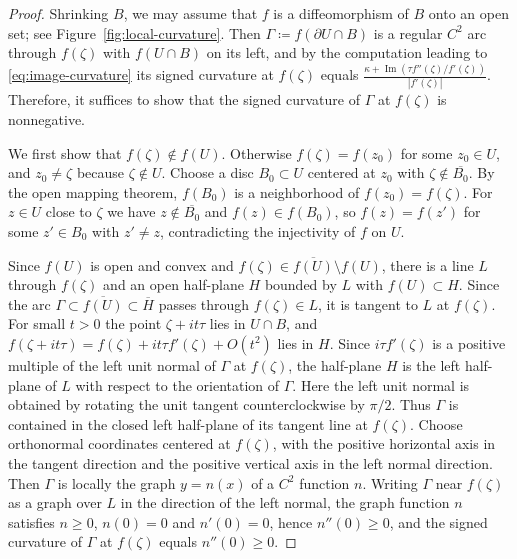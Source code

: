 \documentclass[a4paper, reqno, 11pt]{amsart}
\theoremstyle{definition}
\begin{document}
\begin{proof}
Shrinking $B$, we may assume that $f$ is a diffeomorphism of $B$ onto an open set; see Figure~\ref{fig:local-curvature}.
Then $\Gamma \coloneqq  f(\partial U \cap B)$ is a regular $C^2$ arc through $f(\zeta)$ with $f(U \cap B)$ on its left, and by the computation leading to \eqref{eq:image-curvature} its signed curvature at $f(\zeta)$ equals $\frac{ \kappa + \operatorname{Im}( \tau f''(\zeta)/f'(\zeta) ) }{ |f'(\zeta)| }$.
Therefore, it suffices to show that the signed curvature of $\Gamma$ at $f(\zeta)$ is nonnegative.

We first show that $f(\zeta) \notin f(U)$.
Otherwise $f(\zeta) = f(z_0)$ for some $z_0 \in U$, and $z_0 \neq \zeta$ because $\zeta \notin U$.
Choose a disc $B_0 \subset U$ centered at $z_0$ with $\zeta \notin \overline{B_0}$.
By the open mapping theorem, $f(B_0)$ is a neighborhood of $f(z_0) = f(\zeta)$.
For $z \in U$ close to $\zeta$ we have $z \notin \overline{B_0}$ and $f(z) \in f(B_0)$, so $f(z) = f(z')$ for some $z' \in B_0$ with $z' \ne z$, contradicting the injectivity of $f$ on $U$.

Since $f(U)$ is open and convex and $f(\zeta) \in \overline{f(U)} \setminus f(U)$, there is a line $L$ through $f(\zeta)$ and an open half-plane $H$ bounded by $L$ with $f(U) \subset H$.
Since the arc $\Gamma \subset \overline{f(U)} \subset \overline{H}$ passes through $f(\zeta) \in L$, it is tangent to $L$ at $f(\zeta)$.
For small $t > 0$ the point $\zeta + i t \tau$ lies in $U \cap B$, and $f(\zeta + it\tau) = f(\zeta) + i t \tau f'(\zeta) + O(t^2)$ lies in $H$. 
Since $i\tau f'(\zeta)$ is a positive multiple of the left unit normal of $\Gamma$ at $f(\zeta)$, the half-plane $H$ is the left half-plane of $L$ with respect to the orientation of $\Gamma$. 
Here the left unit normal is obtained by rotating the unit tangent counterclockwise by $\pi/2$. 
Thus $\Gamma$ is contained in the closed left half-plane of its tangent line at $f(\zeta)$. 
Choose orthonormal coordinates centered at $f(\zeta)$, with the positive horizontal axis in the tangent direction and the positive vertical axis in the left normal direction. 
Then $\Gamma$ is locally the graph $y=n(x)$ of a $C^2$ function $n$.
Writing $\Gamma$ near $f(\zeta)$ as a graph over $L$ in the direction of the left normal, the graph function $n$ satisfies $n \ge  0$, $n(0) = 0$ and $n'(0) = 0$, hence $n''(0) \ge  0$, and the signed curvature of $\Gamma$ at $f(\zeta)$ equals $n''(0) \ge  0$.
\end{proof}
\end{document}
